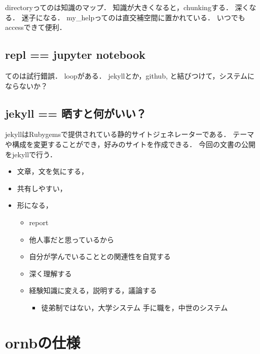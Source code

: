 \documentclass[a4,p11]{article}
\begin{document}
directoryってのは知識のマップ．
知識が大きくなると，chunkingする．
深くなる．
迷子になる．
my\_helpってのは直交補空間に置かれている．
いつでもaccessできて便利．

\subsection{repl == jupyter notebook}
\label{sec:org24bbdfe}
てのは試行錯誤．
loopがある．
jekyllとか，github, と結びつけて，システムにならないか？

\subsection{jekyll == 晒すと何がいい？}
\label{sec:org8d8ed6a}
jekyllはRubygemsで提供されている静的サイトジェネレーターである．
テーマや構成を変更することができ，好みのサイトを作成できる．
今回の文書の公開をjekyllで行う．
\begin{itemize}
\item 文章，文を気にする，
\item 共有しやすい，
\item 形になる，
\begin{itemize}
\item report
\item 他人事だと思っているから
\item 自分が学んでいることとの関連性を自覚する
\item 深く理解する
\item 経験知識に変える，説明する，議論する
\begin{itemize}
\item 徒弟制ではない，大学システム
手に職を，中世のシステム
\end{itemize}
\end{itemize}
\end{itemize}

\section{ornbの仕様}
\label{sec:orgf03f175}
\end{document}
